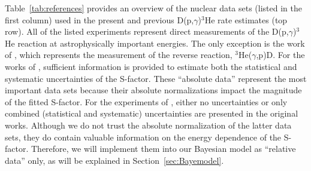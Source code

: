 \documentclass[twocolumn]{aastex63}
\begin{document}
Table~\ref{tab:references} provides an overview of the nuclear data sets (listed in the first column) used in the present and previous D(p,$\gamma$)$^3$He rate estimates (top row). All of the listed experiments represent direct measurements of the D(p,$\gamma$)$^3$He reaction at astrophysically important energies. The only exception is the work of \citet{War63}, which represents the measurement of the reverse reaction, $^3$He($\gamma$,p)D. For the works of \citet{War63,Sch97,Ma97,Cas02,Tisma:2019ug,Mossa20,Turkat21}, sufficient information is provided to estimate both the statistical and systematic uncertainties of the S-factor. These ``absolute data'' represent the most important data sets because their absolute normalizations impact the magnitude of the fitted S-factor. For the experiments of \citet{Gri55,Gri62,Gri63,Bai70}, either no uncertainties or only combined (statistical and systematic) uncertainties are presented in the original works. Although we do not trust the absolute normalization of the latter data sets, they do contain valuable information on the energy dependence of the S-factor. Therefore, we will implement them into our Bayesian model as ``relative data'' only, as will be explained in Section~\ref{sec:Bayemodel}. 
%
\end{document}
